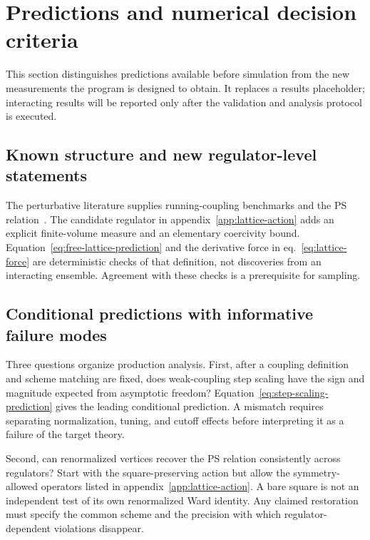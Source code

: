 \section{Predictions and numerical decision criteria}
\label{sec:results}

This section distinguishes predictions available before simulation from the new measurements the program is designed to obtain.  It replaces a results placeholder; interacting results will be reported only after the validation and analysis protocol is executed.

\subsection{Known structure and new regulator-level statements}

The perturbative literature supplies running-coupling benchmarks and the PS relation~\cite{Holdom:2023,Holdom:2024,Anderson:2026}.  The candidate regulator in appendix~\ref{app:lattice-action} adds an explicit finite-volume measure and an elementary coercivity bound.  Equation~\eqref{eq:free-lattice-prediction} and the derivative force in eq.~\eqref{eq:lattice-force} are deterministic checks of that definition, not discoveries from an interacting ensemble.  Agreement with these checks is a prerequisite for sampling.

\subsection{Conditional predictions with informative failure modes}

Three questions organize production analysis.  First, after a coupling definition and scheme matching are fixed, does weak-coupling step scaling have the sign and magnitude expected from asymptotic freedom?  Equation~\eqref{eq:step-scaling-prediction} gives the leading conditional prediction.  A mismatch requires separating normalization, tuning, and cutoff effects before interpreting it as a failure of the target theory.

Second, can renormalized vertices recover the PS relation consistently across regulators?  Start with the square-preserving action but allow the symmetry-allowed operators listed in appendix~\ref{app:lattice-action}.  A bare square is not an independent test of its own renormalized Ward identity.  Any claimed restoration must specify the common scheme and the precision with which regulator-dependent violations disappear.

